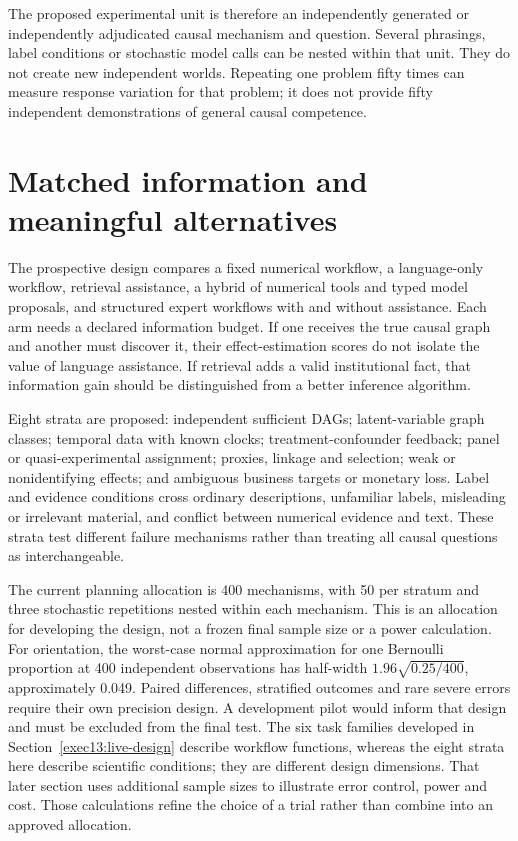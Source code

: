The proposed experimental unit is therefore an independently generated or
independently adjudicated causal mechanism and question. Several phrasings,
label conditions or stochastic model calls can be nested within that unit.
They do not create new independent worlds. Repeating one problem fifty times
can measure response variation for that problem; it does not provide fifty
independent demonstrations of general causal competence.

\section{Matched information and meaningful alternatives}

The prospective design compares a fixed numerical workflow, a language-only
workflow, retrieval assistance, a hybrid of numerical tools and typed model
proposals, and structured expert workflows with and without assistance.
Each arm needs a declared information budget. If one receives the true
causal graph and another must discover it, their effect-estimation scores
do not isolate the value of language assistance. If retrieval adds a valid
institutional fact, that information gain should be distinguished from a
better inference algorithm.

Eight strata are proposed: independent sufficient DAGs; latent-variable
graph classes; temporal data with known clocks; treatment-confounder
feedback; panel or quasi-experimental assignment; proxies, linkage and
selection; weak or nonidentifying effects; and ambiguous business targets
or monetary loss. Label and evidence conditions cross ordinary descriptions,
unfamiliar labels, misleading or irrelevant material, and conflict between
numerical evidence and text. These strata test different failure mechanisms
rather than treating all causal questions as interchangeable.

The current planning allocation is 400 mechanisms, with 50 per stratum and
three stochastic repetitions nested within each mechanism. This is an
allocation for developing the design, not a frozen final sample size or a
power calculation. For orientation, the worst-case normal approximation for
one Bernoulli proportion at 400 independent observations has half-width
\(1.96\sqrt{0.25/400}\), approximately 0.049. Paired differences, stratified
outcomes and rare severe errors require their own precision design. A
development pilot would inform that design and must be excluded from the
final test. The six task families developed in Section~\ref{exec13:live-design} describe workflow functions, whereas the eight strata here describe scientific conditions; they are different design dimensions. That later section uses additional sample sizes to illustrate error control, power and cost. Those calculations refine the choice of a trial rather than combine into an approved allocation.

